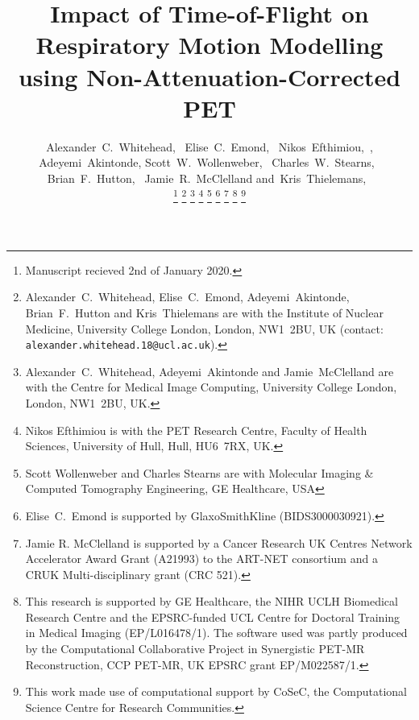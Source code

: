 \documentclass[10pt,twocolumn,twoside,letterpaper]{IEEEtran}
\begin{document}
\title{Impact of Time-of-Flight on Respiratory Motion Modelling using Non-Attenuation-Corrected PET}

\pagestyle{plain}

\author{Alexander~C.~Whitehead,~
        Elise~C.~Emond,~
        Nikos~Efthimiou,~,
        Adeyemi~Akintonde,
        Scott~W.~Wollenweber,~
        Charles~W.~Stearns,~
        Brian~F.~Hutton,~
        Jamie~R.~McClelland
        and~Kris~Thielemans,~%

    \thanks{Manuscript recieved 2nd of January 2020.}%
    \thanks{Alexander~C.~Whitehead, Elise~C.~Emond, Adeyemi~Akintonde, Brian~F.~Hutton and Kris~Thielemans are with the Institute of Nuclear Medicine, University College London, London, NW1~2BU, UK (contact: \texttt{alexander.whitehead.18@ucl.ac.uk}).}%
    \thanks{Alexander~C.~Whitehead, Adeyemi~Akintonde and Jamie~McClelland are with the Centre for Medical Image Computing, University College London, London, NW1~2BU, UK.}%
    \thanks{Nikos Efthimiou is with the PET Research Centre, Faculty of Health Sciences, University of Hull, Hull, HU6~7RX, UK.}%
    \thanks{Scott Wollenweber and Charles Stearns are with Molecular Imaging \& Computed Tomography Engineering, GE Healthcare, USA}%
    \thanks{Elise~C.~Emond is supported by GlaxoSmithKline (BIDS3000030921).}%
    \thanks{Jamie R. McClelland is supported by a Cancer Research UK Centres Network Accelerator Award Grant (A21993) to the ART-NET consortium and a CRUK Multi-disciplinary grant (CRC 521).}%
    \thanks{This research is supported by GE Healthcare, the NIHR UCLH Biomedical Research Centre and the EPSRC-funded UCL Centre for Doctoral Training in Medical Imaging (EP/L016478/1).%
    The software used was partly produced by the Computational Collaborative Project in Synergistic PET-MR Reconstruction, CCP PET-MR, UK EPSRC grant EP/M022587/1.}%
    \thanks{This work made use of computational support by CoSeC, the Computational Science Centre for Research Communities.}%
}

\maketitle
\IEEEpeerreviewmaketitle
\end{document}

